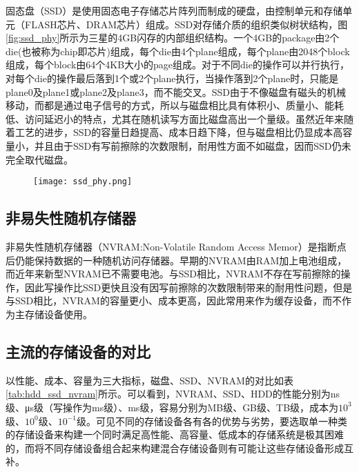 固态盘（SSD）是使用固态电子存储芯片阵列而制成的硬盘，由控制单元和存储单元（FLASH芯片、DRAM芯片）组成。SSD对存储介质的组织类似树状结构，图\ref{fig:ssd_phy}所示为三星的4GB闪存的内部组织结构\cite{agrawal2008design}。一个4GB的package由2个die(也被称为chip即芯片)组成，每个die由4个plane组成，每个plane由2048个block组成，每个block由64个4KB大小的page组成。对于不同die的操作可以并行执行，对每个die的操作最后落到1个或2个plane执行，当操作落到2个plane时，只能是plane0及plane1或plane2及plane3，而不能交叉。SSD由于不像磁盘有磁头的机械移动，而都是通过电子信号的方式，所以与磁盘相比具有体积小、质量小、能耗低、访问延迟小的特点，尤其在随机读写方面比磁盘高出一个量级。虽然近年来随着工艺的进步，SSD的容量日趋提高、成本日趋下降，但与磁盘相比仍显成本高容量小，并且由于SSD有写前擦除的次数限制，耐用性方面不如磁盘，因而SSD仍未完全取代磁盘。

\begin{figure}[!htp]
  \centering
  \texttt{[image: ssd\_phy.png]}
  \hspace{1cm}
\end{figure}

\subsection{非易失性随机存储器}

非易失性随机存储器（NVRAM:Non-Volatile Random Access Memor）是指断点后仍能保持数据的一种随机访问存储器。早期的NVRAM由RAM加上电池组成，而近年来新型NVRAM已不需要电池。与SSD相比，NVRAM不存在写前擦除的操作，因此写操作比SSD更快且没有因写前擦除的次数限制带来的耐用性问题，但是与SSD相比，NVRAM的容量更小、成本更高，因此常用来作为缓存设备，而不作为主存储设备使用。

\subsection{主流的存储设备的对比}

以性能、成本、容量为三大指标，磁盘、SSD、NVRAM的对比如表\ref{tab:hdd_ssd_nvram}所示。可以看到，NVRAM、SSD、HDD的性能分别为ns级、μs级（写操作为ms级）、ms级，容易分别为MB级、GB级、TB级，成本为$10^{3}$级、$10^{0}$级、$10^{-1}$级。可见不同的存储设备各有各的优势与劣势，要选取单一种类的存储设备来构建一个同时满足高性能、高容量、低成本的存储系统是极其困难的，而将不同存储设备组合起来构建混合存储设备则有可能让这些存储设备形成互补。


